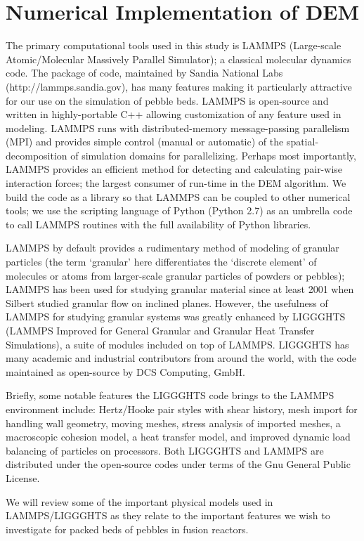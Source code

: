 \section{Numerical Implementation of DEM}\label{sec:dem-solver}


The primary computational tools used in this study is LAMMPS (Large-scale Atomic/Molecular Massively Parallel Simulator)\cite{Plimpton1995}; a classical molecular dynamics code. The package of code, maintained by Sandia National Labs (http://lammps.sandia.gov), has many features making it particularly attractive for our use on the simulation of pebble beds. LAMMPS is open-source and written in highly-portable C++ allowing customization of any feature used in modeling. LAMMPS runs with distributed-memory message-passing parallelism (MPI) and provides simple control (manual or automatic) of the spatial-decomposition of simulation domains for parallelizing. Perhaps most importantly, LAMMPS provides an efficient method for detecting and calculating pair-wise interaction forces; the largest consumer of run-time in the DEM algorithm\cite{Plimpton1995}. We build the code as a library so that LAMMPS can be coupled to other numerical tools; we use the scripting language of Python (Python 2.7) as an umbrella code to call LAMMPS routines with the full availability of Python libraries. 

LAMMPS by default provides a rudimentary method of modeling of granular particles (the term `granular' here differentiates the `discrete element' of molecules or atoms from larger-scale granular particles of powders or pebbles); LAMMPS has been used for studying granular material since at least 2001 when Silbert\etal\cite{Silbert2001} studied granular flow on inclined planes. However, the usefulness of LAMMPS for studying granular systems was greatly enhanced by LIGGGHTS (LAMMPS Improved for General Granular and Granular Heat Transfer Simulations), a suite of modules included on top of LAMMPS. LIGGGHTS has many academic and industrial contributors from around the world, with the code maintained as open-source by DCS Computing, GmbH.

Briefly, some notable features the LIGGGHTS code brings to the LAMMPS environment include: Hertz/Hooke pair styles with shear history, mesh import for handling wall geometry, moving meshes, stress analysis of imported meshes, a macroscopic cohesion model, a heat transfer model, and improved dynamic load balancing of particles on processors\cite{Kloss2011,Kloss2012}. Both LIGGGHTS and LAMMPS are distributed under the open-source codes under terms of the Gnu General Public License.

We will review some of the important physical models used in LAMMPS/LIGGGHTS as they relate to the important features we wish to investigate for packed beds of pebbles in fusion reactors.


